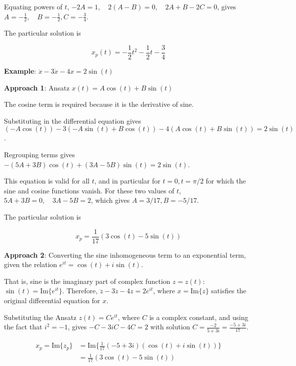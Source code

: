 \begin{paracol}{2}
Equating powers of $t$, $-2A = 1, \quad 2(A-B) = 0, \quad 2A + B - 2C = 0$, gives $A = -\frac{1}{2}, \quad B = -\frac{1}{2}, C = -\frac{3}{4}$.

The particular solution is

$$x_p(t) = - \frac{1}{2}t^2 - \frac{1}{2}t - \frac{3}{4}$$

\switchcolumn

\textbf{Example}: $\ddot{x} - 3 \dot{x} - 4x = 2 \sin(t)$

\textbf{Approach 1}: Ansatz $x(t) = A \cos(t) + B \sin(t)$

The cosine term is required because it is the derivative of sine.

Substituting in the differential equation gives $(- A \cos(t)) - 3(-A \sin(t) + B \cos(t)) - 4(A \cos(t) + B \sin(t)) = 2 \sin(t)$.

Regrouping terms gives $-(5A + 3B) \cos(t) + (3A - 5B) \sin(t) = 2 \sin(t)$.

This equation is valid for all $t$, and in particular for $t = 0, t = \pi / 2$ for which the sine and cosine functions vanish. For these two values of $t$, $5A + 3B = 0, \quad 3A - 5B = 2$, which gives $A = 3/17, B = -5/17$.

The particular solution is

$$x_p = \frac{1}{17} (3 \cos(t) - 5 \sin(t))$$

\textbf{Approach 2}: Converting the sine inhomogeneous term to an exponential term, given the relation $e^{it} = \cos(t) + i \sin(t)$.

That is, sine is the imaginary part of complex function $z = z(t)$: $\sin(t) = \text{Im}\{e^{it}\}$. Therefore, $\ddot{z} - 3 \dot{z} - 4 z = 2 e^{it}$, where $x = \text{Im}\{z\}$ satisfies the original differential equation for $x$.

Substituting the Ansatz $z(t) = C e^{it}$, where $C$ is a complex constant, and using the fact that $i^2 = -1$, gives $-C -3iC - 4C = 2$ with solution $C = \frac{-2}{5+3i} = \frac{-5+3i}{17}$.

\begin{align*}
    x_p = \text{Im}\{z_p\} & = \text{Im}\Big\{ \frac{1}{17} (-5 + 3i) (\cos(t) + i \sin(t)) \Big\} \\
    & = \frac{1}{17} (3 \cos(t) - 5 \sin(t))
\end{align*}

\end{paracol}
